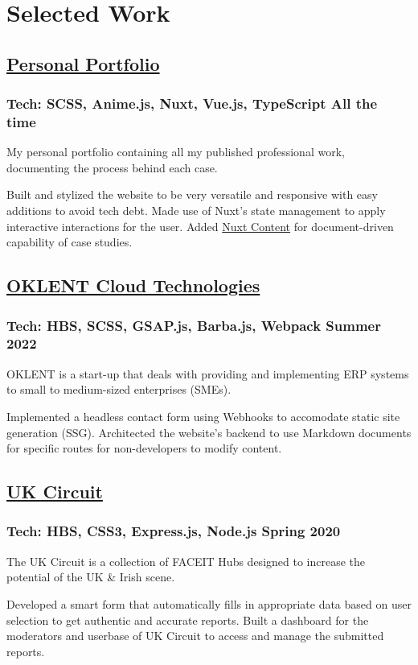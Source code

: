 \section*{Selected Work}
%
%
%
%
%
%
\subsection*{
	\href{https://bumbleboss.xyz/}{Personal Portfolio}
}
\subsubsection*{
	Tech: SCSS, Anime.js, Nuxt, Vue.js, TypeScript
	\hspace*{\fill}
	All the time
}
My personal portfolio containing all my published professional work, documenting the
process behind each case.
\vspace{2mm}
\begin{tasks}
	\task Built and stylized the website to be very versatile and responsive with easy
	additions to avoid tech debt.
	\task Made use of Nuxt's state management to apply interactive interactions for
	the user.
	\task Added \href{https://content.nuxtjs.org/}{Nuxt Content} for document-driven
	capability of case studies.
\end{tasks}
%
%
%
%
\subsection*{
	\href{https://oklent.com/}{OKLENT Cloud Technologies}
}
\subsubsection*{
	Tech: HBS, SCSS, GSAP.js, Barba.js, Webpack
	\hspace*{\fill}
	Summer 2022
}
OKLENT is a start-up that deals with providing and implementing ERP systems
to small to medium-sized enterprises (SMEs).
\vspace{2mm}
\begin{tasks}
	\task Implemented a headless contact form using Webhooks to accomodate static
	site generation (SSG).
	\task Architected the website’s backend to use Markdown documents for
	specific routes for non-developers to modify content.
\end{tasks}
%
%
%
%
\subsection*{
	\href{https://bumbleboss.xyz/w/uk-circuit}{UK Circuit}
}
\subsubsection*{
	Tech: HBS, CSS3, Express.js, Node.js
	\hspace*{\fill}
	Spring 2020
}
The UK Circuit is a collection of FACEIT Hubs designed to increase the potential of the
UK \& Irish scene.
\begin{tasks}
	\task Developed a smart form that automatically fills in appropriate data based on
	user selection to get authentic and accurate reports.
	\task Built a dashboard for the moderators and userbase of UK Circuit to access and manage
	the submitted reports.
\end{tasks}
%
%
%
%
